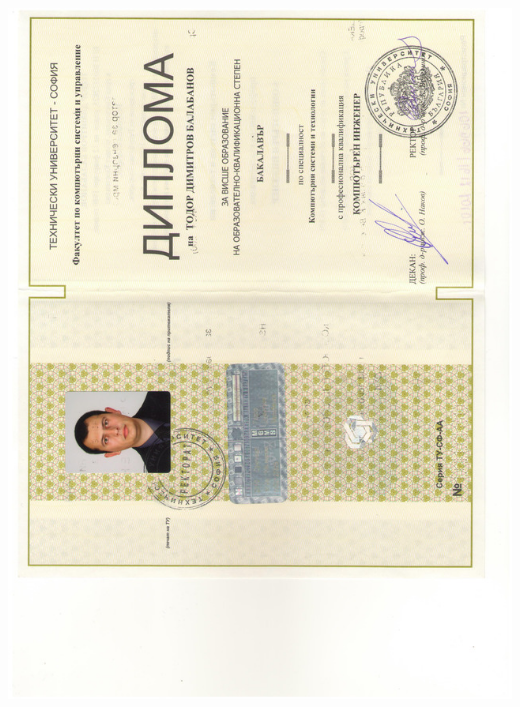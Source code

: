 \documentclass[bulgarian,a4paper]{europasscv}
\begin{document}
\includegraphics[width=\textwidth,height=\textheight,keepaspectratio]{DiplomaTU2010_2}
\end{document}
